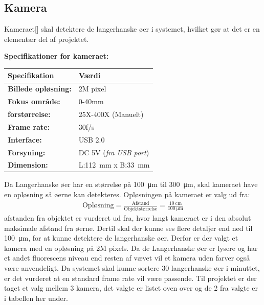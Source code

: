 \newpage
\subsection{Kamera}
\label{subsec:Kamera}
Kameraet[\citet{DH2}] skal detektere de langerhanske øer i systemet, hvilket gør at det er en elementær del af projektet.

\textbf{Specifikationer for kameraet:} 
\begin{center}
		\begin{longtable}{ | m{6.5cm} | m{6.5cm}| } 
			\hline
			\textbf{Specifikation} &\textbf{Værdi} \\ 
			\hline
			\textbf{Billede opløsning:} & 2M pixel \\ 
			\hline
			\textbf{Fokus område:} & 0-40mm  \\ 
			\hline
			\textbf{forstørrelse:} & 25X-400X (Manuelt)  \\ 
			\hline
			\textbf{Frame rate:} & 30f/s  \\ 
			\hline
			\textbf{Interface:} & USB 2.0  \\ 
			\hline
			\textbf{Forsyning:} & DC 5V (\textit{fra USB port})  \\ 
			\hline
			\textbf{Dimension:} & L:\SI{112}{\milli\metre} x B:\SI{33}{\milli\metre}  \\ 
			\hline			
		\end{longtable}
		
	\end{center}
Da Langerhanske øer har en størrelse på \SI{100}{\micro\metre} til \SI{300}{\micro\metre}, skal kameraet have en opløsning så øerne kan detekteres. Opløsningen på kameraet er valg ud fra:
\begin{align}
\text{Opløsning} = \frac{\text{Afstand}}{\text{Objektstørrelse}} = \frac{\SI{10}{\centi\metre}}{\SI{100}{\micro\metre}} 
\end{align} \citep[s.5]{DH1}
afstanden fra objektet er vurderet ud fra, hvor langt kameraet er i den absolut maksimale afstand fra øerne. Dertil skal der kunne ses flere detaljer end ned til \SI{100}{\micro\metre}, for at kunne detektere de langerhanske øer. Derfor er der valgt et kamera med en opløsning på 2M pixels. Da de Langerhanske øer er lysere og har et andet fluorescens niveau end resten af vævet vil et kamera uden farver også være anvendeligt. Da systemet skal kunne sortere 30 langerhanske øer i minuttet, er det vurderet at en standard frame rate vil være passende. Til projektet er der taget et valg mellem 3 kamera, det valgte er listet oven over og de 2 fra valgte er i tabellen her under.

